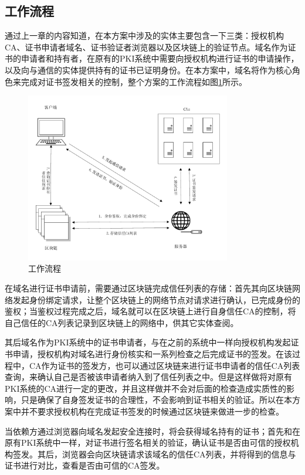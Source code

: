 \subsection{工作流程}

通过上一章的内容知道，在本方案中涉及的实体主要包含一下三类：授权机构CA、证书申请者域名、证书验证者浏览器以及区块链上的验证节点。域名作为证书的申请者和持有者，在原有的PKI系统中需要向授权机构进行证书的申请操作，以及向与通信的实体提供持有的证书已证明身份。在本方案中，域名将作为核心角色来完成对证书签发相关的控制，整个方案的工作流程如图\ref{fig:art}所示。

\begin{figure}[htbp]
 	\centering
 	\includegraphics[width = 0.8\textwidth]{img/art}
 	\caption{工作流程}\label{fig:art}
\end{figure}

在域名进行证书申请前，需要通过区块链完成信任列表的存储：首先其向区块链网络发起身份绑定请求，让整个区块链上的网络节点对请求进行确认，已完成身份的鉴权；当鉴权过程完成之后，域名就可以在区块链上进行自身信任CA的控制，将自己信任的CA列表记录到区块链上的网络中，供其它实体查阅。

其后域名作为PKI系统中的证书申请者，与在之前的系统中一样向授权机构发起证书申请，授权机构对域名进行身份核实和一系列检查之后完成证书的签发。在该过程中，CA作为证书的签发方，也可以通过区块链来进行证书申请者的信任CA列表查询，来确认自己是否被该申请者纳入到了信任列表之中。但是这样做将对原有PKI系统的CA进行一定的更改，并且这样做并不会对后面的检查造成实质性的影响，只是确保了自身签发证书的合理性，不会影响到证书相关的验证。所以在本方案中并不要求授权机构在完成证书签发的时候通过区块链来做进一步的检查。

当依赖方通过浏览器向域名发起安全连接时，将会获得域名持有的证书；首先和在原有PKI系统中一样，对证书进行签名相关的验证，确认证书是否由可信的授权机构签发。其后，浏览器会向区块链请求该域名的信任CA列表，并将得到的信息与证书进行对比，查看是否由可信的CA签发。


